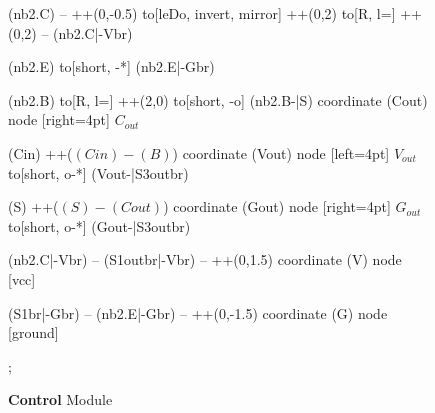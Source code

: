 \documentclass[a4paper, 10pt]{article}
\begin{document}
\begin{figure}[!h]
{\begin{circuitikz}[american]
		(nb2.C) -- ++(0,-0.5)
		to[leDo, invert, mirror] ++(0,2)
		to[R, l=\ledResistor] ++(0,2)
		-- (nb2.C|-Vbr)

		(nb2.E) to[short, -*] (nb2.E|-Gbr)

		(nb2.B) to[R, l=\baseResistor] ++(2,0)
		to[short, -o] (nb2.B-|S)
		coordinate (Cout)
		node [right=4pt] {$C_{out}$}

		(Cin) ++($(Cin)-(B)$)
		coordinate (Vout)
		node [left=4pt] {$V_{out}$}
		to[short, o-*] (Vout-|S3outbr)

		(S) ++($(S)-(Cout)$)
		coordinate (Gout)
		node [right=4pt] {$G_{out}$}
		to[short, o-*] (Gout-|S3outbr)

		(nb2.C|-Vbr) -- (S1outbr|-Vbr)
		-- ++(0,1.5)
		coordinate (V)
		node [vcc] {\vccPotential}

		(S1br|-Gbr) -- (nb2.E|-Gbr)
		-- ++(0,-1.5)
		coordinate (G)
		node [ground] {}

		;

	\end{circuitikz}
	}
	\caption{\textbf{Control} Module}
\end{figure}
\end{document}
